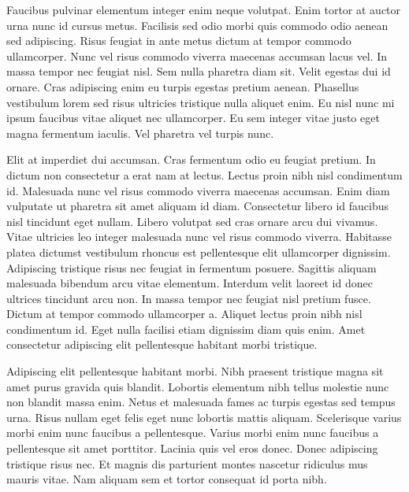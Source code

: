 \documentclass[11pt,a4paper]{article}
\begin{document}
Faucibus pulvinar elementum integer enim neque volutpat. Enim tortor at auctor urna nunc id cursus metus. Facilisis sed odio morbi quis commodo odio aenean sed adipiscing. Risus feugiat in ante metus dictum at tempor commodo ullamcorper. Nunc vel risus commodo viverra maecenas accumsan lacus vel. In massa tempor nec feugiat nisl. Sem nulla pharetra diam sit. Velit egestas dui id ornare. Cras adipiscing enim eu turpis egestas pretium aenean. Phasellus vestibulum lorem sed risus ultricies tristique nulla aliquet enim. Eu nisl nunc mi ipsum faucibus vitae aliquet nec ullamcorper. Eu sem integer vitae justo eget magna fermentum iaculis. Vel pharetra vel turpis nunc.

Elit at imperdiet dui accumsan. Cras fermentum odio eu feugiat pretium. In dictum non consectetur a erat nam at lectus. Lectus proin nibh nisl condimentum id. Malesuada nunc vel risus commodo viverra maecenas accumsan. Enim diam vulputate ut pharetra sit amet aliquam id diam. Consectetur libero id faucibus nisl tincidunt eget nullam. Libero volutpat sed cras ornare arcu dui vivamus. Vitae ultricies leo integer malesuada nunc vel risus commodo viverra. Habitasse platea dictumst vestibulum rhoncus est pellentesque elit ullamcorper dignissim. Adipiscing tristique risus nec feugiat in fermentum posuere. Sagittis aliquam malesuada bibendum arcu vitae elementum. Interdum velit laoreet id donec ultrices tincidunt arcu non. In massa tempor nec feugiat nisl pretium fusce. Dictum at tempor commodo ullamcorper a. Aliquet lectus proin nibh nisl condimentum id. Eget nulla facilisi etiam dignissim diam quis enim. Amet consectetur adipiscing elit pellentesque habitant morbi tristique.

Adipiscing elit pellentesque habitant morbi. Nibh praesent tristique magna sit amet purus gravida quis blandit. Lobortis elementum nibh tellus molestie nunc non blandit massa enim. Netus et malesuada fames ac turpis egestas sed tempus urna. Risus nullam eget felis eget nunc lobortis mattis aliquam. Scelerisque varius morbi enim nunc faucibus a pellentesque. Varius morbi enim nunc faucibus a pellentesque sit amet porttitor. Lacinia quis vel eros donec. Donec adipiscing tristique risus nec. Et magnis dis parturient montes nascetur ridiculus mus mauris vitae. Nam aliquam sem et tortor consequat id porta nibh.
\end{document}
